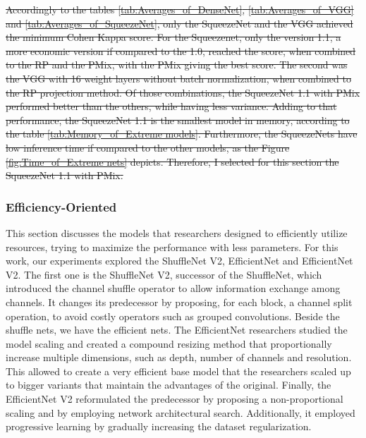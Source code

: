\sout{
Accordingly to the tables \ref{tab:Averages_of_DenseNet}, \ref{tab:Averages_of_VGG} and \ref{tab:Averages_of_SqueezeNet}, only the SqueezeNet and the VGG achieved the minimum Cohen Kappa score. For the Squeezenet, only the version 1.1, a more economic version if compared to the 1.0, reached the score, when combined to the \gls{RP} and the \gls{PMix}, with the \gls{PMix} giving the best score. The second was the VGG with 16 weight layers without batch normalization, when combined to the \gls{RP} projection method. Of those combinations, the SqueezeNet 1.1 with \gls{PMix} performed better than the others, while having less variance. Adding to that performance, the SqueezeNet 1.1 is the smallest model in memory, according to the table \ref{tab:Memory_of_Extreme models}. Furthermore, the SqueezeNets have low inference time if compared to the other models, as the Figure \ref{fig:Time_of_Extreme nets} depicts. Therefore, I selected for this section the SqueezeNet 1.1 with \gls{PMix}.
}






\FloatBarrier

\subsubsection{Efficiency-Oriented}

This section discusses the models that researchers designed to efficiently utilize resources, trying to maximize the performance with less parameters. For this work, our experiments explored the ShuffleNet V2, EfficientNet and EfficientNet V2. The first one is the ShuffleNet V2, successor of the ShuffleNet, which introduced the channel shuffle operator to allow information exchange among channels. It changes its predecessor by proposing, for each block, a channel split operation, to avoid costly operators such as grouped convolutions. Beside the shuffle nets, we have the efficient nets. The EfficientNet researchers studied the model scaling and created a compound resizing method that proportionally increase multiple dimensions, such as depth, number of channels and resolution. This allowed to create a very efficient base model that the researchers scaled up to bigger variants that maintain the advantages of the original. Finally, the EfficientNet V2 reformulated the predecessor by proposing a non-proportional scaling and by employing network architectural search. Additionally, it employed progressive learning by gradually increasing the dataset regularization.  

